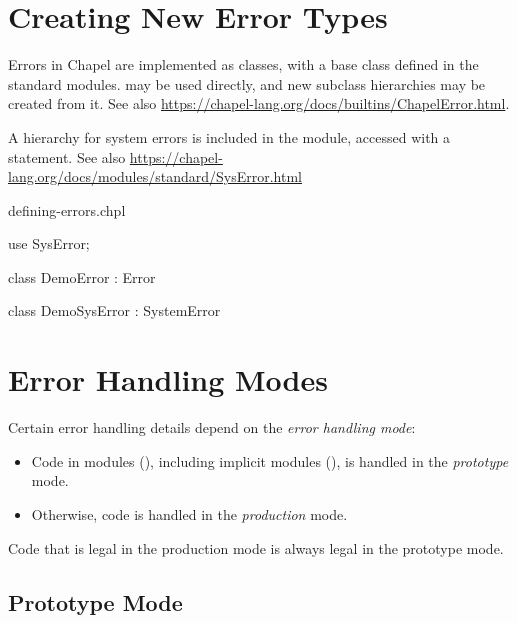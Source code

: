 \section{Creating New Error Types}
\label{Creating_New_Error_Types}

Errors in Chapel are implemented as classes, with a base class 
defined in the standard modules.  may be used directly, and new
subclass hierarchies may be created from it.  See also
\url{https://chapel-lang.org/docs/builtins/ChapelError.html}.

A hierarchy for system errors is included in the  module,
accessed with a  statement.  See also
\url{https://chapel-lang.org/docs/modules/standard/SysError.html}

\begin{chapelexample}{defining-errors.chpl}
\begin{chapel}
use SysError;

class DemoError : Error { }

class DemoSysError : SystemError { }
\end{chapel}
\end{chapelexample}


\section{Error Handling Modes}
\label{Error_Handling_Modes}

Certain error handling details depend on the \emph{error handling mode}:

\begin{itemize}

\item Code in  modules (),
      including implicit modules (),
      is handled in the \emph{prototype} mode.

\item Otherwise, code is handled in the \emph{production} mode.

\end{itemize}

Code that is legal in the production mode is always legal
in the prototype mode.

\subsection{Prototype Mode}
\label{Errors_Prototype_Mode}


